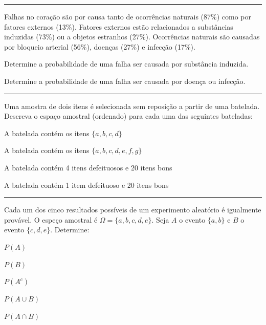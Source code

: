 \documentclass[a4paper,11pt,fleqn]{article}\usepackage[]{graphicx}\usepackage[]{color}
\theoremstyle{definition}
\begin{document}
\begin{compactenum}
\vspace{0.3cm}
\hrule
\vspace{0.3cm}

\item Falhas no coração são por causa tanto de ocorrências naturais
  (87\%) como por fatores externos (13\%). Fatores externos estão
  relacionados a substâncias induzidas (73\%) ou a objetos estranhos
  (27\%). Ocorrências naturais são causadas por bloqueio arterial
  (56\%), doenças (27\%) e infecção (17\%).
  \begin{compactenum}
  \item Determine a probabilidade de uma falha ser causada por
    substância induzida.
  \item Determine a probabilidade de uma falha ser causada por doença ou
    infecção.
  \end{compactenum}

\vspace{0.3cm}
\hrule
\vspace{0.3cm}

\item Uma amostra de dois itens é selecionada sem reposição a partir de
  uma batelada. Descreva o espaço amostral (ordenado) para cada uma das
  seguintes bateladas:
  \begin{compactenum}
  \item A batelada contém os itens $\{a, b, c, d\}$
  \item A batelada contém os itens $\{a, b, c, d, e, f, g\}$
  \item A batelada contém 4 itens defeituosos e 20 itens bons
  \item A batelada contém 1 item defeituoso e 20 itens bons
  \end{compactenum}

\vspace{0.3cm}
\hrule
\vspace{0.3cm}

\item Cada um dos cinco resultados possíveis de um experimento aleatório
  é igualmente provável. O espeço amostral é $\Omega = \{a, b, c, d,
  e\}$. Seja $A$ o evento $\{a, b\}$ e $B$ o evento $\{c, d, e\}$.
  Determine: \\
  \begin{inparaenum}
  \item $P(A)$ \,
  \item $P(B)$ \,
  \item $P(A^c)$ \,
  \item $P(A \cup B)$ \,
  \item $P(A \cap B)$
  \end{inparaenum}


\end{compactenum}
\end{document}
